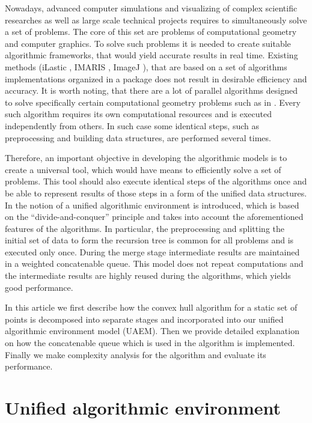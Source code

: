 \documentclass[sigconf]{acmart}
\begin{document}
	Nowadays, advanced computer simulations and visualizing of complex scientific researches as well as large scale technical projects requires to simultaneously solve a set of problems. The core of this set are problems of computational geometry and computer graphics. To solve such problems it is needed to create suitable algorithmic frameworks, that would yield accurate results in real time. Existing methods (iLastic \cite{ilastik}, IMARIS \cite{imaris}, ImageJ \cite{imagej}), that are based on a set of algorithms implementations organized in a package does not result in desirable efficiency and accuracy. It is worth noting, that there are a lot of parallel algorithms designed to solve specifically certain computational geometry problems such as in \cite{aggarwal,atallah,cole,amato,chen,berkman,goodman,akl,jaja,leeuwen,reif}. Every such algorithm requires its own computational resources and is executed independently from others. In such case some identical steps, such as preprocessing and building data structures, are performed several times. 

	Therefore, an important objective in developing the algorithmic models is to create a universal tool, which would have means to efficiently solve a set of problems. This tool should also execute identical steps of the algorithms once and be able to represent results of those steps in a form of the unified data structures. In \cite{tereshchenko} the notion of a unified algorithmic environment is introduced, which is based on the ``divide-and-conquer'' principle and takes into account the aforementioned features of the algorithms. In particular, the preprocessing and splitting the initial set of data to form the recursion tree is common for all problems and is executed only once. During the merge stage intermediate results are maintained in a weighted concatenable queue. This model does not repeat computations and the intermediate results are highly reused during the algorithms, which yields good performance.

	In this article we first describe how the convex hull algorithm for a static set of points is decomposed into separate stages and incorporated into our unified algorithmic environment model (UAEM). Then we provide detailed explanation on how the concatenable queue which is used in the algorithm is implemented. Finally we make complexity analysis for the algorithm and evaluate its performance.

\section{Unified algorithmic environment}
\label{sec:unified-algorithmic-environment}
\end{document}
